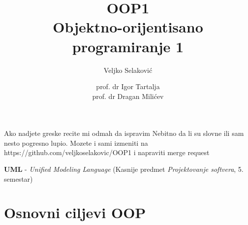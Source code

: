 \documentclass{article}
\title{OOP1\\\large Objektno-orijentisano programiranje 1}
\author{Veljko Selaković }
\date{prof. dr Igor Tartalja\\ prof. dr Dragan Milićev}
\let\olditemize\itemize
\let\endolditemize\enditemize
\renewenvironment{itemize}{%
    \smaller
    \olditemize
}{%
    \endolditemize
}
\begin{document}
\maketitle
Ako nadjete greske recite mi odmah da ispravim
Nebitno da li su slovne ili sam nesto pogresno lupio. Mozete i sami izmeniti na https://github.com/veljkoselakovic/OOP1 i napraviti merge request
\newpage


\begin{itemize}
    \item \textbf{UML} - \textit{Unified Modeling Language} (Kasnije predmet \textit{Projektovanje softvera}, 5. semestar)
\end{itemize}
\section{Osnovni ciljevi OOP}
\end{document}
